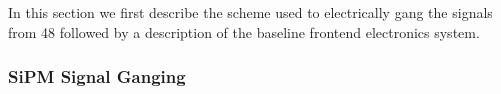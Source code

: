 In this section we first describe the scheme used to electrically gang the signals from 48  followed by a description of the baseline frontend electronics system.




\subsubsection{SiPM Signal Ganging}
\label{sec:pds-design-ganging}

